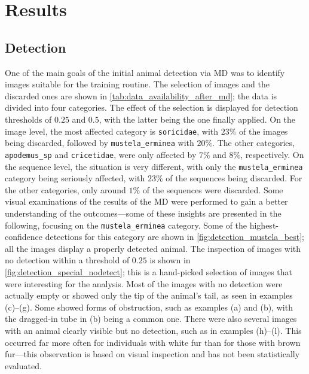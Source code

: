 

\section{Results}
\label{results}

\subsection{Detection}
One of the main goals of the initial animal detection via \ac{MD} was to identify images suitable for the training routine.
The selection of images and the discarded ones are shown in \autoref{tab:data_availability_after_md}; the data is divided into four categories.
The effect of the selection is displayed for detection thresholds of \(0.25\) and \(0.5\), with the latter being the one finally applied.
On the image level, the most affected category is \texttt{soricidae}, with \(23\%\) of the images being discarded, followed by \texttt{mustela\_erminea} with \(20\%\).
The other categories, \texttt{apodemus\_sp} and \texttt{cricetidae}, were only affected by \(7\%\) and \(8\%\), respectively.
On the sequence level, the situation is very different, with only the \texttt{mustela\_erminea} category being seriously affected, with \(23\%\) of the sequences being discarded.
For the other categories, only around \(1\%\) of the sequences were discarded.
Some visual examinations of the results of the \ac{MD} were performed to gain a better understanding of the outcomes---some of these insights are presented in the following, focusing on the \texttt{mustela\_erminea} category.
Some of the highest-confidence detections for this category are shown in \autoref{fig:detection_mustela_best}; all the images display a properly detected animal.
The inspection of images with no detection within a threshold of \(0.25\) is shown in \autoref{fig:detection_special_nodetect}; this is a hand-picked selection of images that were interesting for the analysis.
Most of the images with no detection were actually empty or showed only the tip of the animal's tail, as seen in examples (c)--(g).
Some showed forms of obstruction, such as examples (a) and (b), with the dragged-in tube in (b) being a common one.
There were also several images with an animal clearly visible but no detection, such as in examples (h)--(l).
This occurred far more often for individuals with white fur than for those with brown fur---this observation is based on visual inspection and has not been statistically evaluated.

